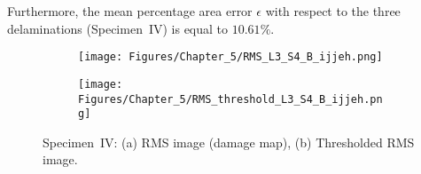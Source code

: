 Furthermore, the mean percentage area error \(\epsilon\) with respect to the three delaminations (Specimen~IV) is equal to \(10.61\%\).
\begin{figure} [!h]
	\begin{subfigure}[b]{.5\textwidth}
		\centering
		\texttt{[image: Figures/Chapter\_5/RMS\_L3\_S4\_B\_ijjeh.png]}
		\caption{} 
		\label{fig:RMS_L3_S4_B_ijjeh}
	\end{subfigure}
		\hfill
	\begin{subfigure}[b]{.42\textwidth}
		\centering
		\texttt{[image: Figures/Chapter\_5/RMS\_threshold\_L3\_S4\_B\_ijjeh.png]}
		\caption{} 
		\label{fig:RMS_threshold_L3_S4_B_ijjeh}
	\end{subfigure}
	\caption{Specimen~IV: (a) RMS image (damage map), (b) Thresholded RMS image.}
	\label{fig:RMS_L3_S4_B__images}
\end{figure} 
\clearpage